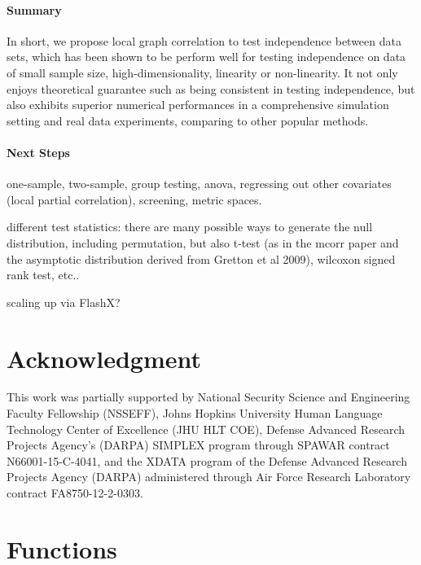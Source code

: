 \documentclass[11pt]{article}
\begin{document}
\paragraph{Summary}

In short, we propose local graph correlation to test independence between data sets, which has been shown to be perform well for testing independence on data of small sample size, high-dimensionality, linearity or non-linearity. It not only enjoys theoretical guarantee such as being consistent in testing independence, but also exhibits superior numerical performances in a comprehensive simulation setting and real data experiments, comparing to other popular methods.


\paragraph{Next Steps}

one-sample, two-sample, group testing, anova, regressing out other covariates (local partial correlation), screening, metric spaces.

different test statistics: there are many possible ways to generate the null distribution, including permutation, but also t-test (as in the mcorr paper and the asymptotic distribution derived from Gretton et al 2009), wilcoxon signed rank test, etc..


scaling up via FlashX?

\section*{Acknowledgment}
This work was partially supported by 
% 
National Security Science and Engineering Faculty Fellowship (NSSEFF), 
% 
Johns Hopkins University Human Language Technology Center of Excellence (JHU HLT COE), 
% 
Defense Advanced Research Projects Agency's (DARPA) SIMPLEX program through SPAWAR contract N66001-15-C-4041, 
% 
and the XDATA program of the Defense Advanced Research Projects Agency (DARPA) administered through Air Force Research Laboratory contract FA8750-12-2-0303.



\appendix
\setcounter{figure}{0}
\renewcommand\thefigure{\arabic{figure}} 

\section{Functions}
\label{appen:a}
\end{document}
